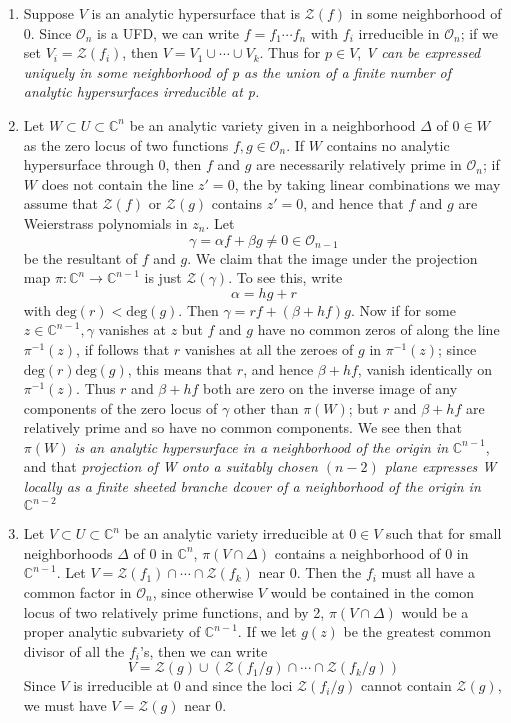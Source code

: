\begin{enumerate}
	\item Suppose $V$ is an analytic hypersurface that is $ \mathcal{Z}(f)$ in some neighborhood of $0$. Since $ \mathcal{O}_n$ is a UFD, we can write $f = f_1 \cdots f_n$ with $f_i$ irreducible in $ \mathcal{O}_n$; if we set $V_i = \mathcal{Z}(f_i)$, then $V = V_1 \cup \cdots \cup V_k$. Thus for $ p \in V$, \textit{V can be expressed uniquely in some neighborhood of p as the union of a finite number of analytic hypersurfaces irreducible at p.}
	\item Let $W \subset U \subset \mathbb{C}^n$ be an analytic variety given in a neighborhood $\Delta$ of $0 \in W$ as the zero locus of two functions $f,g \in \mathcal{O}_n$. If $W$ contains no analytic hypersurface through 0, then $f$ and $g$ are necessarily relatively prime in $ \mathcal{O}_n$; if $W$ does not contain the line $z' = 0$, the by taking linear combinations we may assume that $ \mathcal{Z}(f)$ or $ \mathcal{Z}(g)$ contains $z' = 0$, and hence that $f$ and $g$ are Weierstrass polynomials in $z_n$. Let
\[
	\gamma = \alpha f + \beta g \neq 0 \in \mathcal{O}_{n-1}
\]
be the resultant of $f$ and $g$. We claim that the image under the projection map $
\pi: \mathbb{C}^n \to \mathbb{C}^{n-1}$ is just $ \mathcal{Z}( \gamma )$. To see this, write
\[
\alpha = hg + r
\]
with $ \mathrm{deg}(r) < \mathrm{deg}(g)$. Then $\gamma = rf + (\beta + hf) g$. Now if for some $z \in \mathbb{C}^{n-1}, \gamma$ vanishes at $z$ but $f$ and $g$ have no common zeros of along the line $\pi^{-1}(z)$, if follows that $r$ vanishes at all the zeroes of $g$ in $\pi^{-1}(z)$; since $\mathrm{deg}(r)  \mathrm{deg}(g)$, this means that $r$, and hence $ \beta + hf$, vanish identically on $\pi^{-1}(z)$. Thus $r$ and $\beta + hf$ both are zero on the inverse image of any components of the zero locus of $ \gamma$ other than $\pi(W)$; but $r$ and $\beta + hf$ are relatively prime and so have no common components. We see then that $\pi(W)$ \textit{is an analytic hypersurface in a neighborhood of the origin in} $ \mathbb{C}^{n-1}$, and that \textit{projection of W  onto a suitably chosen $(n-2)$ plane expresses W locally as a finite sheeted branche dcover of a neighborhood of the origin in} $ \mathbb{C}^{n-2}$
\item Let $V \subset U \subset \mathbb{C}^n$ be an analytic variety irreducible at $0 \in V$ such that for small neighborhoods $\Delta$ of 0 in $ \mathbb{C}^n$, $\pi(V \cap \Delta)$ contains a neighborhood of 0 in $ \mathbb{C}^{n-1}$. Let $V = \mathcal{Z}(f_1) \cap \cdots \cap \mathcal{Z}(f_k)$ near 0. Then the $f_i$ must all have a common factor in $ \mathcal{O}_n$, since otherwise $V$ would be contained in the comon locus of two relatively prime functions, and by 2, $\pi(V \cap \Delta)$ would be a proper analytic subvariety of $ \mathbb{C}^{n-1}$. If we let $g(z)$ be the greatest common divisor of all the $f_i$'s, then we can write
\[
	V = \mathcal{Z}(g) \cup \left( \mathcal{Z}(f_1/g) \cap \cdots \cap \mathcal{Z}(f_k/g) \right) 
\]
Since $V$ is irreducible at 0 and since the loci $ \mathcal{Z}(f_i/g)$ cannot contain $ \mathcal{Z}(g)$, we must have $V = \mathcal{Z}(g)$ near 0.


\end{enumerate}

